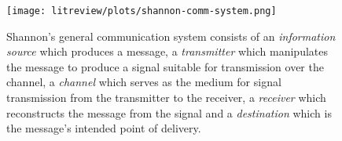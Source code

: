 \begin{figure}
\centering
\texttt{[image: litreview/plots/shannon-comm-system.png]}
\caption[\label{fig:shannon-comm-system}Shannon's general communication system consists of
an \textit{information source} which produces a message,
a \textit{transmitter} which manipulates the message to produce a signal suitable for transmission over the channel,
a \textit{channel} which serves as the medium for signal transmission from the transmitter to the receiver,
a \textit{receiver} which reconstructs the message from the signal and
a \textit{destination} which is the message's intended point of delivery.]{\label{fig:shannon-comm-system}Shannon's general communication system consists of
an \textit{information source} which produces a message,
a \textit{transmitter} which manipulates the message to produce a signal suitable for transmission over the channel,
a \textit{channel} which serves as the medium for signal transmission from the transmitter to the receiver,
a \textit{receiver} which reconstructs the message from the signal and
a \textit{destination} which is the message's intended point of delivery\protect\footnotemark[1].}
\end{figure}

